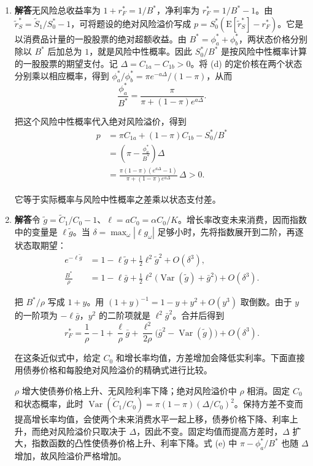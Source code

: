 \begin{solution}[blank-type=manual,blank-vsep=12\baselineskip]
\begin{enumerate}[label=(\alph*)]
 \item \textbf{解答}\quad 无风险总收益率为 $1+r_F^*=1/B^*$，净利率为 $r_F^*=1/B^*-1$。由 $\tilde r_S^*=\tilde S_1/S_0^*-1$，可将题设的绝对风险溢价写成 $p=S_0^*(\mathrm E[\tilde r_S^*]-r_F^*)$。它是以消费品计量的一股股票的绝对超额收益。由 $B^*=\phi_a^*+\phi_b^*$，两状态价格分别除以 $B^*$ 后加总为 $1$，就是风险中性概率。因此 $S_0^*/B^*$ 是按风险中性概率计算的一股股票的期望支付。记 $\Delta=C_{1a}-C_{1b}>0$。将 (d) 的定价核在两个状态分别乘以相应概率，得到 $\phi_a^*/\phi_b^*=\pi e^{-a\Delta}/(1-\pi)$，从而
 \[
 \frac{\phi_a^*}{B^*}=\frac{\pi}{\pi+(1-\pi)e^{a\Delta}}.
 \]

 把这个风险中性概率代入绝对风险溢价，得到
 \[
 \begin{aligned}
 p&=\pi C_{1a}+(1-\pi)C_{1b}-S_0^*/B^*\\
 &=\left(\pi-\frac{\phi_a^*}{B^*}\right)\Delta\\
 &=\frac{\pi(1-\pi)(e^{a\Delta}-1)}{\pi+(1-\pi)e^{a\Delta}}\,\Delta>0.
 \end{aligned}
 \]

 它等于实际概率与风险中性概率之差乘以状态支付差。

 \item \textbf{解答}\quad 令 $\tilde g=\widetilde C_1/C_0-1$、$\ell=aC_0=\alpha C_0/K$。增长率改变未来消费，因而指数中的变量是 $\ell\tilde g$。当 $\delta=\max_\omega|\ell g_\omega|$ 足够小时，先将指数展开到二阶，再逐状态取期望：
 \[
 \begin{aligned}
 e^{-\ell\tilde g}&=1-\ell\tilde g+\tfrac12\ell^2\tilde g^2+O(\delta^3),\\
 \frac{B^*}{\rho}&=1-\ell\bar g+
    \tfrac12\ell^2\bigl(\operatorname{Var}(\tilde g)+\bar g^2\bigr)+O(\delta^3).
 \end{aligned}
 \]

 把 $B^*/\rho$ 写成 $1+y$。用 $(1+y)^{-1}=1-y+y^2+O(y^3)$ 取倒数。由于 $y$ 的一阶项为 $-\ell\bar g$，$y^2$ 的二阶项就是 $\ell^2\bar g^2$。合并后得到
 \[
 r_F^*=\frac{1}{\rho}-1+\frac{\ell}{\rho}\bar g
     +\frac{\ell^2}{2\rho}\bigl(\bar g^2-\operatorname{Var}(\tilde g)\bigr)
     +O(\delta^3).
 \]

 在这条近似式中，给定 $C_0$ 和增长率均值，方差增加会降低实利率。下面直接用债券价格和每股绝对风险溢价的精确式进行比较。

 $\rho$ 增大使债券价格上升、无风险利率下降；绝对风险溢价中 $\rho$ 相消。固定 $C_0$ 和状态概率，此时 $\operatorname{Var}(\widetilde C_1/C_0)=\pi(1-\pi)(\Delta/C_0)^2$。保持方差不变而提高增长率均值，会使两个未来消费水平一起上移，债券价格下降、利率上升，而绝对风险溢价只取决于 $\Delta$，因此不变。固定均值而提高方差时，$\Delta$ 扩大，指数函数的凸性使债券价格上升、利率下降。式 (e) 中 $\pi-\phi_a^*/B^*$ 也随 $\Delta$ 增加，故风险溢价严格增加。


\end{enumerate}
\end{solution}
